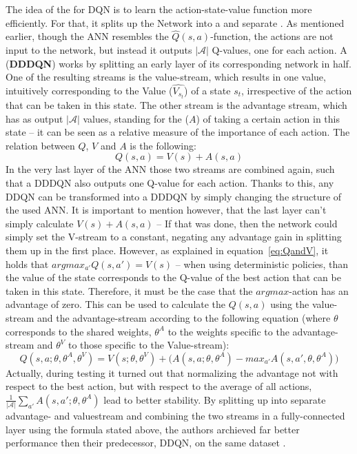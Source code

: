 The idea of the \cite{wang_dueling_2015} for DQN is to learn the action-state-value function more efficiently. For that, it splits up the Network into a  and separate . As mentioned earlier, though the ANN resembles the $\hat{Q}(s,a)$-function, the actions are not input to the network, but instead it outputs $|\mathcal{A}|$ Q-values, one for each action. A  (\textbf{DDDQN}) works by splitting an early layer of its corresponding network in half. One of the resulting streams is the value-stream, which results in one value, intuitively corresponding to the Value ($\hat{V_{s_t}}$) of a state $s_t$, irrespective of the action that can be taken in this state. The other stream is  the advantage stream, which has as output $|\mathcal{A}|$ values, standing for the  ($A$) of taking a certain action in this state -- it can be seen as a relative measure of the importance of each action. The relation between $Q$, $V$ and $A$ is the following:
\begin{equation*}
	Q(s,a) = V(s) + A(s,a)
\end{equation*}
In the very last layer of the ANN those two streams are combined again, such that a DDDQN also outputs one Q-value for each action. Thanks to this, any DDQN can be transformed into a DDDQN by simply changing the structure of the used ANN. It is important to mention however, that the last layer can't simply calculate $V(s) + A(s,a)$ -- If that was done, then the network could simply set the V-stream to a constant, negating any advantage gain in splitting them up in the first place. However, as explained in equation~\ref{eq:QandV}, it holds that $argmax_{a'}Q(s,a') = V(s)$ -- when using deterministic policies, than the value of the state corresponds to the Q-value of the best action that can be taken in this state. Therefore, it must be the case that the $argmax$-action has an advantage of zero. This can be used to calculate the $Q(s,a)$ using the value-stream and the advantage-stream according to the following equation (where $\theta$ corresponds to the shared weights, $\theta^A$ to the weights specific to the advantage-stream and $\theta^V$ to those specific to the Value-stream):
\begin{equation*}
	Q(s,a; \theta, \theta^A, \theta^V) = V(s; \theta, \theta^V) + \big( A(s,a; \theta, \theta^A) - max_{a'}A(s,a',\theta, \theta^A) \big)
\end{equation*}
Actually, during testing it turned out that normalizing the advantage not with respect to the best action, but with respect to the average of all actions, $\frac{1}{|\mathcal{A}|} \sum_{a'} A(s, a'; \theta, \theta^A)$ lead to better stability. By splitting up into separate advantage- and valuestream and combining the two streams in a fully-connected layer using the formula stated above, the authors archieved far better performance then their predecessor, DDQN, on the same dataset \cite{wang_dueling_2015}.\\

